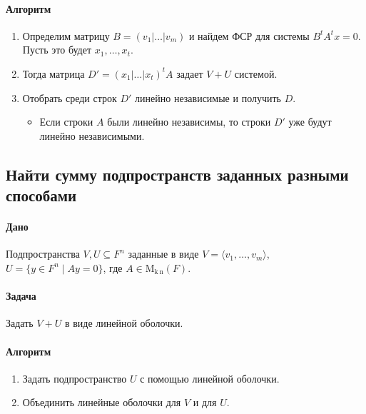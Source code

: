\documentclass{article}
\newcommand{\MatrixDim}[3]{\operatorname{\mathrm{M}_{#2\,#3}}(#1)}
\begin{document}
\paragraph{Алгоритм}

\begin{enumerate}
\item Определим матрицу $B = (v_1|\ldots|v_m)$ и найдем ФСР для системы $B^tA^t x = 0$.
Пусть это будет $x_1,\ldots, x_t$.

\item Тогда матрица $D' = (x_1|\ldots|x_t)^tA$ задает $V + U$ системой.

\item Отобрать среди строк $D'$ линейно независимые и получить $D$.
\begin{itemize}
\item Если строки $A$ были линейно независимы, то строки $D'$ уже будут линейно независимыми.
\end{itemize}
\end{enumerate}

\subsection{Найти сумму подпространств заданных разными способами}

\paragraph{Дано}

Подпространства $V,U\subseteq F^{n}$ заданные в виде $V =\langle v_1,\ldots,v_m\rangle$, $U = \{y\in F^{n}\mid Ay = 0\}$, где $A\in \MatrixDim{F}{k}{n}$.

\paragraph{Задача}

Задать $V + U$ в виде линейной оболочки.

\paragraph{Алгоритм}

\begin{enumerate}
\item Задать подпространство $U$ с помощью линейной оболочки.

\item Объединить линейные оболочки для $V$ и для $U$.
\end{enumerate}
\end{document}

